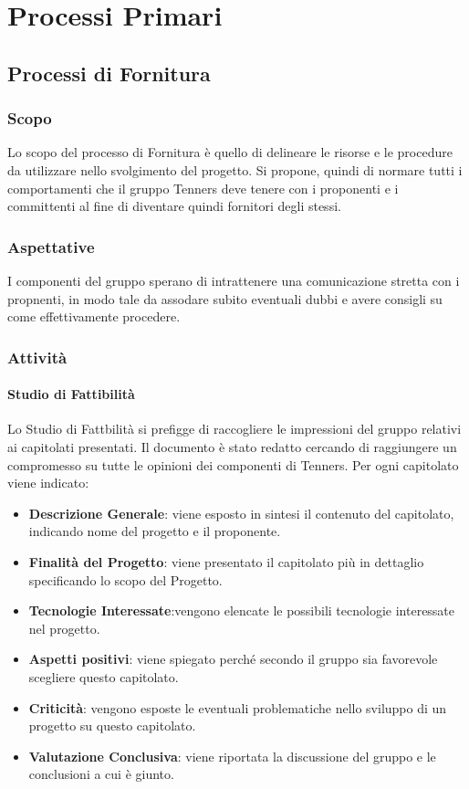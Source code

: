 \section{Processi Primari}
\subsection{Processi di Fornitura}
\subsubsection{Scopo}
Lo scopo del processo di Fornitura è quello di delineare le risorse e le procedure da utilizzare nello svolgimento del progetto. Si propone, quindi di normare tutti i comportamenti che il gruppo Tenners deve tenere con i proponenti e i committenti al fine di diventare quindi fornitori degli stessi.
\subsubsection{Aspettative}
I componenti del gruppo sperano di intrattenere una comunicazione stretta con i propnenti, in modo tale da assodare subito eventuali dubbi e avere consigli su come effettivamente procedere.
\subsubsection{Attività}
\paragraph{Studio di Fattibilità}
Lo Studio di Fattbilità si prefigge di raccogliere le impressioni del gruppo relativi ai capitolati presentati. Il documento è stato redatto cercando di raggiungere un compromesso su tutte le opinioni dei componenti di Tenners. Per ogni capitolato viene indicato:
\begin{itemize}
  \item \textbf{Descrizione Generale}: viene esposto in sintesi il contenuto del capitolato, indicando nome del progetto e il proponente.
  \item \textbf{Finalità del Progetto}: viene presentato il capitolato più in dettaglio specificando lo scopo del Progetto.
  \item \textbf{Tecnologie Interessate}:vengono elencate le possibili tecnologie interessate nel progetto.
  \item \textbf{Aspetti positivi}: viene spiegato perché secondo il gruppo sia favorevole scegliere questo capitolato.
  \item \textbf{Criticità}: vengono esposte le eventuali problematiche nello sviluppo di un progetto su questo capitolato.
  \item \textbf{Valutazione Conclusiva}: viene riportata la discussione del gruppo e le conclusioni a cui è giunto.
\end{itemize}
